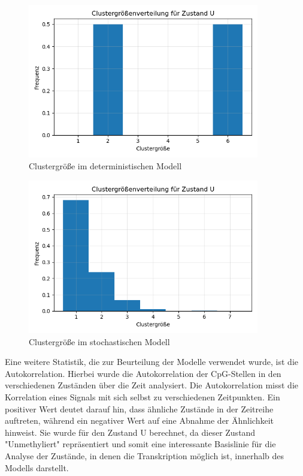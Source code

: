 \documentclass{SeminarV2}
\begin{document}
\begin{figure}[htbp]
  \centering
  \includegraphics[width=0.9\textwidth]{images/Cluster_det.png}
  \caption{Clustergröße im deterministischen Modell}
  \label{fig:cpg_states_cluster_det}
  \end{figure}
\begin{figure}[htbp]
  \centering
  \includegraphics[width=0.9\textwidth]{images/Cluster_stoch.png}
  \caption{Clustergröße im stochastischen Modell}
  \label{fig:cpg_states_cluster_stoch}
  \end{figure}

Eine weitere Statistik, die zur Beurteilung der Modelle verwendet wurde, ist die Autokorrelation.
Hierbei wurde die Autokorrelation der CpG-Stellen in den verschiedenen Zuständen über die Zeit analysiert.
Die Autokorrelation misst die Korrelation eines Signals mit sich selbst zu verschiedenen Zeitpunkten. Ein positiver Wert deutet darauf hin, dass ähnliche Zustände in der Zeitreihe auftreten, während ein negativer Wert auf eine Abnahme der Ähnlichkeit hinweist.
Sie wurde für den Zustand U berechnet, da dieser Zustand "Unmethyliert" repräsentiert und somit eine interessante Basislinie für die Analyse der Zustände, in denen die Transkription möglich ist, innerhalb des Modells darstellt.
\end{document}
